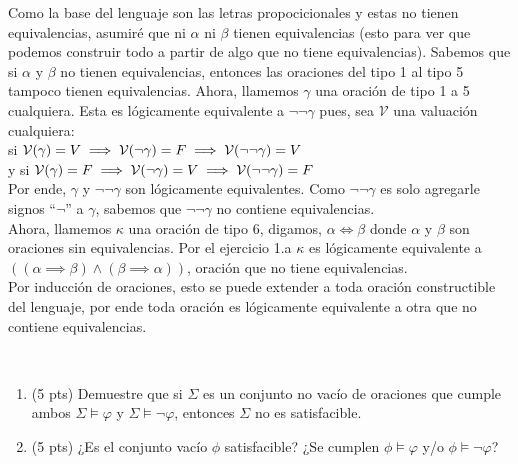 \begin{sol}
\begin{enumerate}[label=(\alph*)]
              Como la base del lenguaje son las letras propocicionales y estas no tienen equivalencias, asumiré que ni $\alpha$ ni $\beta$ tienen equivalencias (esto para ver que podemos construir todo a partir de algo que no tiene equivalencias). Sabemos que si $\alpha$ y $\beta$ no tienen equivalencias, entonces las oraciones del tipo 1 al tipo 5 tampoco tienen equivalencias. Ahora, llamemos $\gamma$ una oración de tipo 1 a 5 cualquiera. Esta es lógicamente equivalente a $\neg \neg \gamma$ pues, sea $\mathcal{V}$ una valuación cualquiera: \\
              si $\mathcal{V}(\gamma) = V\\
                  \implies \mathcal{V}(\neg \gamma) = F\\
                  \implies \mathcal{V}(\neg \neg \gamma) = V$\\
              y si $\mathcal{V}(\gamma) = F\\
                  \implies \mathcal{V}(\neg \gamma) = V\\
                  \implies \mathcal{V}(\neg \neg \gamma) = F$\\
              Por ende, $\gamma$ y $\neg \neg \gamma$ son lógicamente equivalentes. Como $\neg \neg \gamma$ es solo agregarle signos ``$\neg$'' a $\gamma$, sabemos que $\neg \neg \gamma$ no contiene equivalencias.\\
              Ahora, llamemos $\kappa$ una oración de tipo 6, digamos, $\alpha \iff \beta$ donde $\alpha$ y $\beta$ son oraciones sin equivalencias. Por el ejercicio 1.a $\kappa$ es lógicamente equivalente a $((\alpha \implies \beta) \wedge (\beta \implies \alpha))$, oración que no tiene equivalencias. \\
              Por inducción de oraciones, esto se puede extender a toda oración constructible del lenguaje, por ende toda oración es lógicamente equivalente a otra que no contiene equivalencias.
    \end{enumerate}
\end{sol}

\begin{prob}[10 pts]
    \
    \begin{enumerate}[label=(\alph*)]
        \item (5 pts) Demuestre que si $\Sigma$ es un conjunto no vacío de oraciones que cumple ambos $\Sigma \models \varphi$ y $\Sigma \models \neg \varphi$, entonces $\Sigma$ no es satisfacible.
        \item (5 pts) ¿Es el conjunto vacío $\phi$ satisfacible? ¿Se cumplen $\phi \models \varphi$ y/o $\phi \models \neg \varphi$?
    \end{enumerate}
\end{prob}

